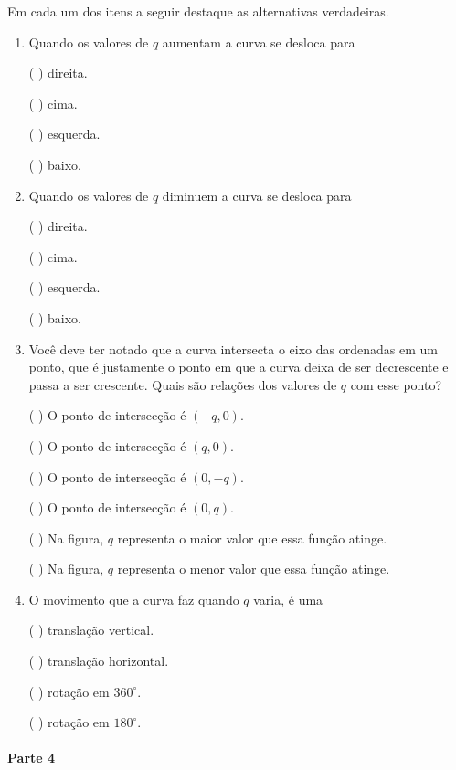 \documentclass[10 pt,usenames,dvipsnames, oneside]{article}
\begin{document}
\needspace{10em}
Em cada um dos itens a seguir destaque as alternativas verdadeiras.
\begin{enumerate}
\item {} 
Quando os valores de \(q\) aumentam a curva se desloca para

({ }{ }{ }) direita.

({ }{ }{ }) cima.

({ }{ }{ }) esquerda.

({ }{ }{ }) baixo.

\item {} 
Quando os valores de \(q\) diminuem a curva se desloca para

({ }{ }{ }) direita.

({ }{ }{ }) cima.

({ }{ }{ }) esquerda.

({ }{ }{ }) baixo.

\item {} 
Você deve ter notado que a curva intersecta o eixo das ordenadas em um ponto, que é justamente o ponto em que a curva deixa de ser decrescente e passa a ser crescente. Quais são relações dos valores de \(q\) com esse ponto?

({ }{ }{ }) O ponto de intersecção é \((-q,0)\).

({ }{ }{ }) O ponto de intersecção é \((q,0)\).

({ }{ }{ }) O ponto de intersecção é \((0,-q)\).

({ }{ }{ }) O ponto de intersecção é \((0,q)\).

({ }{ }{ }) Na figura, \(q\) representa o maior valor que essa função atinge.

({ }{ }{ }) Na figura, \(q\) representa o menor valor que essa função atinge.

\item {} 
O movimento que a curva faz quando \(q\) varia, é uma

({ }{ }{ }) translação vertical.

({ }{ }{ }) translação horizontal.

({ }{ }{ }) rotação em \(360^{\circ}\).

({ }{ }{ }) rotação em \(180^{\circ}\).

\end{enumerate}
\needspace{10em}

\paragraph{Parte 4}
\end{document}
